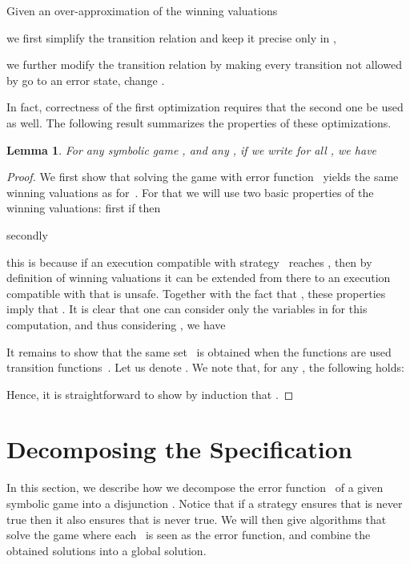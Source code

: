 \documentclass[submission,copyright,creativecommons]{eptcs}
\newtheorem{lemma}{Lemma}
\begin{document}
Given an over-approximation  of the winning valuations
\begin{inparaenum}[]
\item we first simplify the transition relation and keep it precise only in
	,
\item we further modify the transition relation by making every transition not
	allowed by  go to an error state, \ie change
	.
\end{inparaenum}
In fact, correctness of the first optimization requires that the second one be
used as well. The following result summarizes the properties of these
optimizations.
\begin{lemma}\label{lem:correct-restrict}
	For any symbolic game , and any , if we
	write  for all , we have
	
\end{lemma}
\begin{proof}
  We first show that solving the game with error function~ yields
  the same winning valuations as for~.  For that we will use two basic
  properties of the winning valuations: first if  then
  
  secondly
  
  this is because if an execution compatible with strategy~ reaches
  , then by definition of winning valuations it can be extended
  from there to an execution compatible with  that is unsafe. Together
  with the fact that , these
  properties imply that .
  It is clear that one can consider only the variables in  for
  this computation, and thus considering , we
  have
  

  It remains to show that the same set~ is obtained when the
  functions  are used transition functions~.  Let us denote .  We note that, for any , the following holds:
  
  Hence, it is straightforward to show by induction that .
\end{proof}

\section{Decomposing the Specification}\label{sec:decomp}
In this section, we describe how we decompose the error function~
of a given symbolic game into a disjunction \textit{\ie}
.
Notice that if a strategy  ensures
that  is never true then it also ensures that 
is never true.  We will then give algorithms that solve the game where
each~ is seen as the error function, and combine the obtained solutions
into a global solution. 
\end{document}

